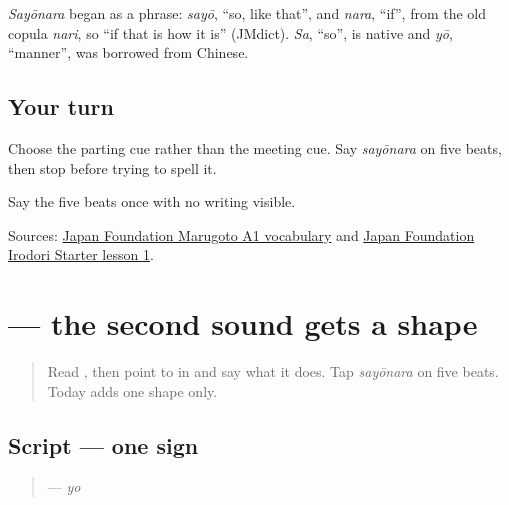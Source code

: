 \begin{cousinweb}
\emph{Sayōnara} began as a phrase: \emph{sayō}, \textquotedblleft{}so, like that\textquotedblright{}, and \emph{nara}, \textquotedblleft{}if\textquotedblright{}, from the old copula \emph{nari}, so \textquotedblleft{}if that is how it is\textquotedblright{} (JMdict). \emph{Sa}, \textquotedblleft{}so\textquotedblright{}, is native and \emph{yō}, \textquotedblleft{}manner\textquotedblright{}, was borrowed from Chinese.
\end{cousinweb}

\subsection*{Your turn}
Choose the parting cue rather than the meeting cue. Say \emph{sayōnara} on five beats, then stop before trying to spell it.

\begin{tcolorbox}[breakable,colback=teal!4,colframe=teal!35!black,title={Before you move on}]
Say the five beats once with no writing visible.

Sources: \href{https://words.marugotoweb.jp/search\_detail.php?cd=1\&id=435\&lang=en\&lv=A1\&source=cando}{Japan Foundation Marugoto A1 vocabulary} and \href{https://www.irodori.jpf.go.jp/assets/data/starter/pdf/X\_L01\_au.pdf}{Japan Foundation Irodori Starter lesson 1}.
\end{tcolorbox}
\section[\texorpdfstring{\ja{よ} (yo)}{よ (yo)}]{ — the second sound gets a shape}

\label{lesson:JA-W08-yo}



\begin{quote}
Read \textbf{}, then point to \textbf{} in \textbf{} and say what it does. Tap \emph{sayōnara} on five beats. Today adds one shape only.
\end{quote}

\subsection*{Script — one sign}

\begin{quote}
\textbf{} — \emph{yo}
\end{quote}

